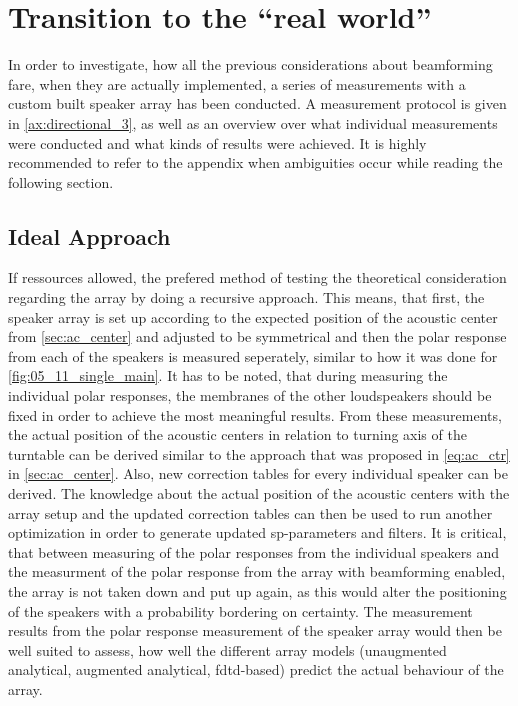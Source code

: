 \section{Transition to the ``real world'' }\label{sec:rw_transition}
In order to investigate, how all the previous considerations about beamforming fare, when they are actually implemented, a series of measurements with a custom built speaker array has been conducted. A measurement protocol is given in \autoref{ax:directional_3}, as well as an overview over what individual measurements were conducted and what kinds of results were achieved. It is highly recommended to refer to the appendix when ambiguities occur while reading the following section.\\


\subsection{Ideal Approach}\label{ssec:ideal_approach}
If ressources allowed, the prefered method of testing the theoretical consideration regarding the array by doing a recursive approach. This means, that first, the speaker array is set up according to the expected position of the acoustic center from \autoref{sec:ac_center} and adjusted to be symmetrical and then the polar response from each of the speakers is measured seperately, similar to how it was done for \autoref{fig:05_11_single_main}. It has to be noted, that during measuring the individual polar responses, the membranes of the other loudspeakers should be fixed in order to achieve the most meaningful results. From these measurements, the actual position of the acoustic centers in relation to turning axis of the turntable can be derived similar to the approach that was proposed in \autoref{eq:ac_ctr} in \autoref{sec:ac_center}. Also, new correction tables for every individual speaker can be derived. The knowledge about the actual position of the acoustic centers with the array setup and the updated correction tables can then be used to run another optimization in order to generate updated \gls{sp}-parameters and filters. It is critical, that between measuring of the polar responses from the individual speakers and the measurment of the polar response from the array with beamforming enabled, the array is not taken down and put up again, as this would alter the positioning of the speakers with a probability bordering on certainty.
The measurement results from the polar response measurement of the speaker array would then be well suited to assess, how well the different array models (unaugmented analytical, augmented analytical, \gls{fdtd}-based) predict the actual behaviour of the array.


